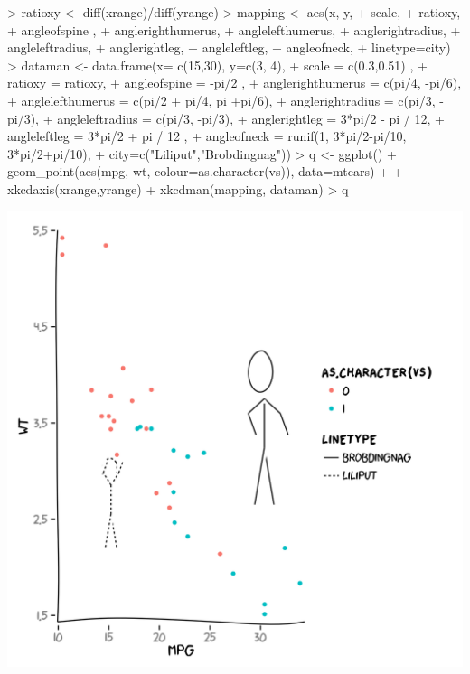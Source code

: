 \documentclass[10pt]{article}
\begin{document}
\begin{center}
\begin{Schunk}
\begin{Sinput}
> ratioxy <- diff(xrange)/diff(yrange)
> mapping <- aes(x,  y,
+                scale,
+                ratioxy,
+                angleofspine ,
+                anglerighthumerus,
+                anglelefthumerus,
+                anglerightradius,
+                angleleftradius,
+                anglerightleg,
+                angleleftleg,
+                angleofneck,
+                linetype=city)
> dataman <- data.frame(x= c(15,30), y=c(3, 4),
+                       scale = c(0.3,0.51) ,
+                       ratioxy = ratioxy,
+                       angleofspine =  -pi/2  ,
+                       anglerighthumerus = c(pi/4, -pi/6),
+                       anglelefthumerus = c(pi/2 + pi/4, pi +pi/6),
+                       anglerightradius = c(pi/3, -pi/3),
+                       angleleftradius = c(pi/3, -pi/3),
+                       anglerightleg = 3*pi/2  - pi / 12,
+                       angleleftleg = 3*pi/2  + pi / 12 ,
+                       angleofneck = runif(1, 3*pi/2-pi/10, 3*pi/2+pi/10),
+                       city=c("Liliput","Brobdingnag"))
> q <- ggplot() + geom_point(aes(mpg, wt, colour=as.character(vs)), data=mtcars) + 
+   xkcdaxis(xrange,yrange) + xkcdman(mapping, dataman)
> q
\end{Sinput}
\end{Schunk}
\includegraphics{xkcd-intro-009}
\end{center}
\end{document}
